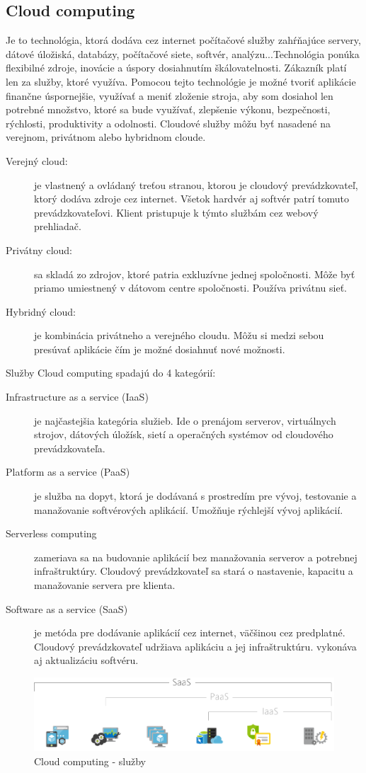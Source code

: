 \documentclass[../../main.tex]{subfiles}
\begin{document}
\subsection{Cloud computing}
Je to technológia, ktorá dodáva cez internet počítačové služby zahŕňajúce servery, dátové úložiská, databázy, počítačové siete, softvér, analýzu...Technológia ponúka flexibilné zdroje, inovácie a úspory dosiahnutím škálovatelnosti. Zákazník platí len za služby, ktoré využíva. Pomocou tejto technológie je možné tvoriť aplikácie finančne úspornejšie, využívať a meniť zloženie stroja, aby som dosiahol len potrebné množstvo, ktoré sa bude využívať, zlepšenie výkonu, bezpečnosti, rýchlosti, produktivity a odolnosti.
Cloudové služby môžu byť nasadené na verejnom, privátnom alebo hybridnom cloude.
\begin{description}
    \item[Verejný cloud:] je vlastnený a ovládaný treťou stranou, ktorou je cloudový prevádzkovateľ, ktorý dodáva zdroje cez internet. Všetok hardvér aj softvér patrí tomuto prevádzkovateľovi. Klient pristupuje k týmto službám cez webový prehliadač.
    \item[Privátny cloud:] sa skladá zo zdrojov, ktoré patria exkluzívne jednej spoločnosti. Môže byť priamo umiestnený v dátovom centre spoločnosti. Používa privátnu sieť.
    \item[Hybridný cloud:] je kombinácia privátneho a verejného cloudu. Môžu si medzi sebou presúvať aplikácie čím je možné dosiahnuť nové možnosti. 
\end{description}

Služby Cloud computing spadajú do 4 kategórií:
\begin{description}
     \item[Infrastructure as a service (IaaS)] je najčastejšia kategória služieb. Ide o prenájom serverov, virtuálnych strojov, dátových úložísk, sietí a operačných systémov od cloudového prevádzkovateľa.
     \item[Platform as a service (PaaS)] je služba na dopyt, ktorá je dodávaná s prostredím  pre vývoj, testovanie a manažovanie softvérových aplikácií. Umožňuje rýchlejší vývoj aplikácií.
     \item[Serverless computing] zameriava sa na budovanie aplikácií bez manažovania serverov a potrebnej infraštruktúry. Cloudový prevádzkovateľ sa stará o nastavenie, kapacitu a manažovanie servera pre klienta.
     \item[Software as a service (SaaS)] je metóda pre dodávanie aplikácií cez internet, väčšinou cez predplatné. Cloudový prevádzkovateľ udržiava aplikáciu a jej infraštruktúru. vykonáva aj aktualizáciu softvéru.\cite{azure_cloud}
\end{description}

 \begin{figure}[h!]
 \centering
  \includegraphics[scale=0.5]{images/azure_services.png}
  \caption{Cloud computing - služby\cite{azure_cloud}}
    \label{fig:azure_services}
\end{figure} 


\end{document}
